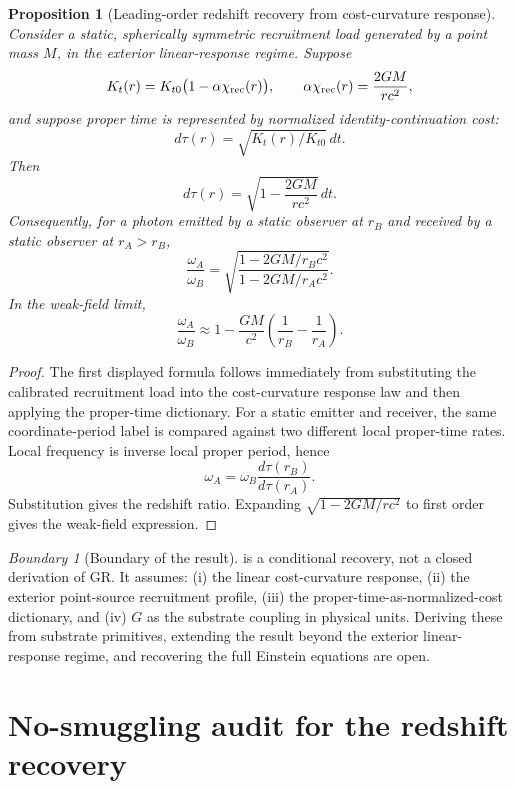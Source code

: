 \documentclass[11pt]{article}
\newtheorem{proposition}[theorem]{Proposition}
\theoremstyle{remark}
\newtheorem{warning}[theorem]{Boundary}
\begin{document}
\begin{proposition}[Leading-order redshift recovery from cost-curvature response]
\label{prop:redshift-recovery}
Consider a static, spherically symmetric recruitment load generated by a point mass \(M\), in the exterior linear-response regime.  Suppose
\[
        K_t(r)=K_{t0}\bigl(1-\alpha\chi_{\rm rec}(r)\bigr),
        \qquad
        \alpha\chi_{\rm rec}(r)=\frac{2GM}{rc^2},
\]
and suppose proper time is represented by normalized identity-continuation cost:
\[
        d\tau(r)=\sqrt{K_t(r)/K_{t0}}\,dt.
\]
Then
\[
        d\tau(r)=\sqrt{1-\frac{2GM}{rc^2}}\,dt.
\]
Consequently, for a photon emitted by a static observer at \(r_B\) and received by a static observer at \(r_A>r_B\),
\[
        \frac{\omega_A}{\omega_B}
        =
        \sqrt{\frac{1-2GM/r_Bc^2}{1-2GM/r_Ac^2}}.
\]
In the weak-field limit,
\[
        \frac{\omega_A}{\omega_B}
        \approx
        1-
        \frac{GM}{c^2}\left(\frac1{r_B}-\frac1{r_A}\right).
\]
\end{proposition}

\begin{proof}
The first displayed formula follows immediately from substituting the calibrated recruitment load into the cost-curvature response law and then applying the proper-time dictionary.  For a static emitter and receiver, the same coordinate-period label is compared against two different local proper-time rates.  Local frequency is inverse local proper period, hence
\[
        \omega_A=\omega_B\frac{d\tau(r_B)}{d\tau(r_A)}.
\]
Substitution gives the redshift ratio.  Expanding \(\sqrt{1-2GM/rc^2}\) to first order gives the weak-field expression.
\end{proof}

\begin{warning}[Boundary of the result]
 is a conditional recovery, not a closed derivation of GR.  It assumes: (i) the linear cost-curvature response, (ii) the exterior point-source recruitment profile, (iii) the proper-time-as-normalized-cost dictionary, and (iv) \(G\) as the substrate coupling in physical units.  Deriving these from substrate primitives, extending the result beyond the exterior linear-response regime, and recovering the full Einstein equations are open.
\end{warning}

\section{No-smuggling audit for the redshift recovery}
\end{document}
